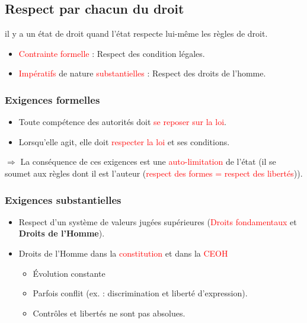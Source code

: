 \subsection{Respect par chacun du droit}

il y a un état de droit quand l'état respecte lui-même les règles de droit.

\begin{itemize}
    \item \textcolor{red}{Contrainte formelle} : Respect des condition légales.
    \item \textcolor{red}{Impératifs} de nature \textcolor{red}{substantielles} : Respect des droits de l'homme.
\end{itemize}

\subsubsection{Exigences formelles}

\begin{itemize}
    \item Toute compétence des autorités doit \textcolor{red}{se reposer sur la loi}.
    \item Lorsqu'elle agit, elle doit \textcolor{red}{respecter la loi} et ses conditions.
\end{itemize}

$\Rightarrow$ La conséquence de ces exigences est une \textcolor{red}{auto-limitation} de l'état (il se soumet aux règles dont il est l'auteur (\textcolor{red}{respect des formes = respect des libertés})).

\subsubsection{Exigences substantielles}

\begin{itemize}
    \item Respect d'un système de valeurs jugées supérieures (\textcolor{red}{Droits fondamentaux} et \textbf{Droits de l'Homme}).
    \item Droits de l'Homme dans la \textcolor{red}{constitution} et dans la \textcolor{red}{CEOH}
    \begin{itemize}
        \item Évolution constante
        \item Parfois conflit (ex. : discrimination et liberté d'expression).
        \item Contrôles et libertés ne sont pas absolues.
    \end{itemize}
\end{itemize}


